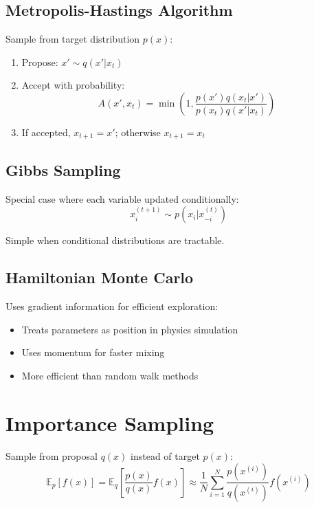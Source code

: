 \subsection{Metropolis-Hastings Algorithm}

Sample from target distribution $p(x)$:
\begin{enumerate}
    \item Propose: $x' \sim q(x'|x_t)$
    \item Accept with probability:
    \begin{equation}
    A(x', x_t) = \min\left(1, \frac{p(x')q(x_t|x')}{p(x_t)q(x'|x_t)}\right)
    \end{equation}
    \item If accepted, $x_{t+1} = x'$; otherwise $x_{t+1} = x_t$
\end{enumerate}

\subsection{Gibbs Sampling}

Special case where each variable updated conditionally:
\begin{equation}
x_i^{(t+1)} \sim p(x_i | x_{-i}^{(t)})
\end{equation}

Simple when conditional distributions are tractable.

\subsection{Hamiltonian Monte Carlo}

Uses gradient information for efficient exploration:
\begin{itemize}
    \item Treats parameters as position in physics simulation
    \item Uses momentum for faster mixing
    \item More efficient than random walk methods
\end{itemize}

\section{Importance Sampling}
\label{sec:importance-sampling}

Sample from proposal $q(x)$ instead of target $p(x)$:
\begin{equation}
\mathbb{E}_{p}[f(x)] = \mathbb{E}_{q}\left[\frac{p(x)}{q(x)} f(x)\right] \approx \frac{1}{N} \sum_{i=1}^{N} \frac{p(x^{(i)})}{q(x^{(i)})} f(x^{(i)})
\end{equation}

